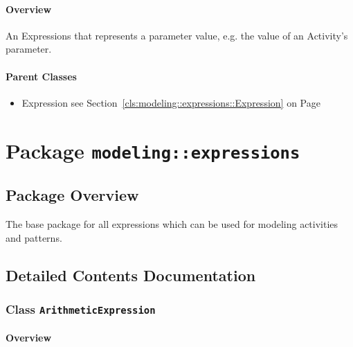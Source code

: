 \paragraph{Overview}

	
			
An Expressions that represents a parameter value, e.g. the value of an Activity's parameter.	
		
	



\paragraph{Parent Classes}
\begin{itemize}
\item Expression see Section~\ref{cls:modeling::expressions::Expression} on Page~\pageref{cls:modeling::expressions::Expression}\end{itemize}
\newpage
		


\section{Package \bfseries \texttt{modeling::expressions}\normalfont}
\subsection{Package Overview}
	
			
The base package for all expressions which can be used for modeling activities
and patterns.	
		
	
			
		



\subsection{Detailed Contents Documentation}
\subsubsection{\Large{Class \bfseries \texttt{ArithmeticExpression}\normalfont}}
\label{cls:modeling::expressions::ArithmeticExpression} 
\paragraph{Overview}

